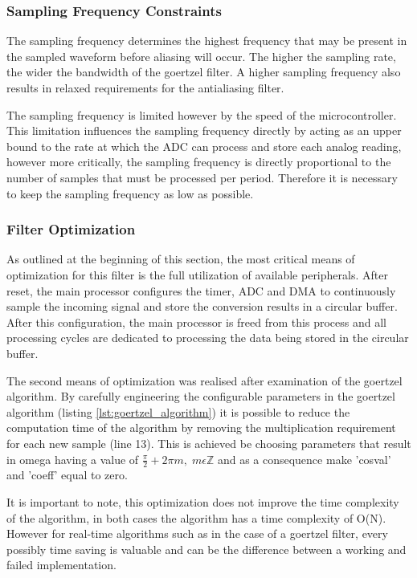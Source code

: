 \subsubsection{Sampling Frequency Constraints}
\label{sec:sampling_frequency_constraints}
The sampling frequency determines the highest frequency that may be present in the sampled waveform before aliasing will occur. The higher the sampling rate, the wider the bandwidth of the goertzel filter. A higher sampling frequency also results in relaxed requirements for the antialiasing filter.

The sampling frequency is limited however by the speed of the microcontroller. This limitation influences the sampling frequency directly by acting as an upper bound to the rate at which the ADC can process and store each analog reading, however more critically, the sampling frequency is directly proportional to the number of samples that must be processed per period. Therefore it is necessary to keep the sampling frequency as low as possible.

\subsubsection{Filter Optimization}
\label{sec:filter_optimization_design}
As outlined at the beginning of this section, the most critical means of optimization for this filter is the full utilization of available peripherals. After reset, the main processor configures the timer, ADC and DMA to continuously sample the incoming signal and store the conversion results in a circular buffer. After this configuration, the main processor is freed from this process and all processing cycles are dedicated to processing the data being stored in the circular buffer.

The second means of optimization was realised after examination of the goertzel algorithm. By carefully engineering the configurable parameters in the goertzel algorithm (listing \ref{lst:goertzel_algorithm}) it is possible to reduce the computation time of the algorithm by removing the multiplication requirement for each new sample (line 13). This is achieved be choosing parameters that result in omega having a value of \(\frac{\pi}{2} + 2\pi m,\; m\epsilon \mathbb{Z}\) and as a consequence make 'cosval' and 'coeff' equal to zero.

It is important to note, this optimization does not improve the time complexity of the algorithm, in both cases the algorithm has a time complexity of O(N). However for real-time algorithms such as in the case of a goertzel filter, every possibly time saving is valuable and can be the difference between a working and failed implementation.


